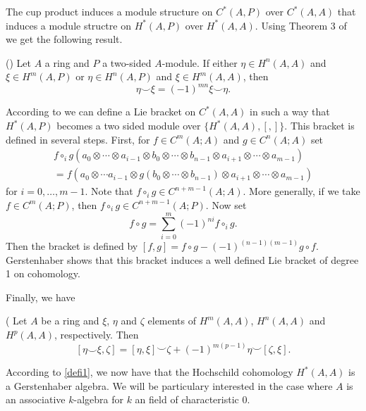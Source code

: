 \documentclass[TFM.tex]{subfiles}
\begin{document}
The cup product induces a module structure on $C^*(A,P)$ over $C^*(A,A)$ that induces a module structre on $H^*(A,P)$ over $H^*(A,A)$. Using Theorem 3 of \cite{Gerstenhaber} we get the following result.

\begin{thm}(\cite[Corollary 2 of ]{Gerstenhaber})
Let $A$ a ring and $P$ a two-sided $A$-module. If either $\eta\in H^n(A,A)$ and $\xi\in H^m(A,P)$ or $\eta\in H^n(A,P)$ and $\xi\in H^m(A,A)$, then
\[
\eta\smile\xi=(-1)^{mn}\xi\smile \eta.
\]
\end{thm}

According to \cite[Theorem 4 of ]{Gerstenhaber} we can define a Lie bracket on $C^*(A,A)$ in such a way that $H^*(A,P)$ becomes a two sided module over $\{H^*(A,A),[,]\}$. This bracket is defined in several steps. First, for $f\in C^m(A;A)$ and $g\in C^n(A;A)$ set
\begin{gather*}
f\circ_i g(a_0\otimes\cdots\otimes a_{i-1}\otimes b_0\otimes\cdots\otimes b_{n-1}\otimes a_{i+1}\otimes\cdots \otimes a_{m-1})\\
=f(a_0\otimes \cdots a_{i-1}\otimes g(b_0\otimes\cdots\otimes b_{n-1})\otimes a_{i+1}\otimes\cdots\otimes a_{m-1})
\end{gather*}
for $i=0,\dots, m-1$. Note that $f\circ_i g\in C^{n+m-1}(A;A)$. More generally, if we take $f\in C^m(A;P)$, then $f\circ_ig\in C^{n+m-1}(A;P)$. Now set
\[
f\circ g=\sum_{i=0}^m (-1)^{ni}f\circ_i g.
\]
Then the bracket is defined by $[f,g]=f\circ g-(-1)^{(n-1)(m-1)}g\circ f$. Gerstenhaber shows that this bracket induces a well defined Lie bracket of degree 1 on cohomology. 

Finally, we have

\begin{thm}(\cite[Corollary 2 of ]{Gerstenhaber}
Let $A$ be a ring and $\xi$, $\eta$ and $\zeta$ elements of $H^m(A,A)$, $H^n(A,A)$ and $H^p(A,A)$, respectively. Then
\[
[\eta\smile\xi, \zeta]=[\eta,\xi]\smile \zeta+(-1)^{m(p-1)}\eta\smile[\zeta,\xi].
\]
\end{thm}


According to \ref{defi1}, we now have that the Hochschild cohomology $H^*(A,A)$ is a Gerstenhaber algebra. We will be particulary interested in the case where $A$ is an associative $k$-algebra for $k$ an field of characteristic 0.
\end{document}
